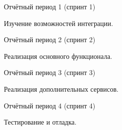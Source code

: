 \documentclass[a4paper,12pt]{article} %
\begin{document}
\begin{enumerate}
{\item Отчётный период 1 (спринт 1)}

Изучение возможностей интеграции.

{\item Отчётный период 2 (спринт 2)}

Реализация основного функционала.

{\item Отчётный период 3 (спринт 3)}

Реализация дополнительных сервисов.

{\item Отчётный период 4 (спринт 4)}

Тестирование и отладка.


\end{enumerate}
\end{document}
